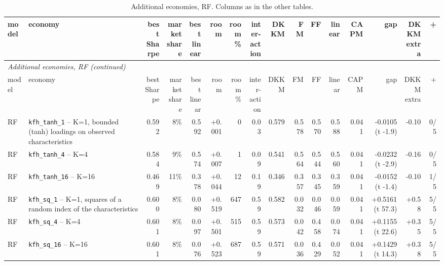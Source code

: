 \begin{landscape}
\begin{longtable}{lp{4.6cm}rrrrrrrrrrrrrr}
\caption{Additional economies, RF. Columns as in the other tables.}\label{tab:xa-rf}\\\hline
model & economy & \shortstack[r]{best\\Sharpe} & \shortstack[r]{market\\share} & \shortstack[r]{best\\linear} & room & \shortstack[r]{room\\\%} & \shortstack[r]{inter-\\action} & DKKM & FM & FF & linear & CAPM & gap & \shortstack[r]{DKKM\\extra} & + \\\hline\endfirsthead
\multicolumn{16}{l}{\textit{Additional economies, RF (continued)}}\\\hline
model & economy & \shortstack[r]{best\\Sharpe} & \shortstack[r]{market\\share} & \shortstack[r]{best\\linear} & room & \shortstack[r]{room\\\%} & \shortstack[r]{inter-\\action} & DKKM & FM & FF & linear & CAPM & gap & \shortstack[r]{DKKM\\extra} & + \\\hline\endhead
\hline\endfoot
RF & \texttt{kfh\_tanh\_1} -- K=1, bounded (tanh) loadings on observed characteristics & 0.592 & 8\% & 0.592 & +0.001 & 0 & 0.03 & 0.579 & 0.578 & 0.570 & 0.588 & 0.041 & -0.0105 (t -1.9) & -0.10 & 0/5 \\
RF & \texttt{kfh\_tanh\_4} -- K=4 & 0.584 & 9\% & 0.574 & +0.007 & 1 & 0.09 & 0.541 & 0.564 & 0.544 & 0.560 & 0.041 & -0.0232 (t -2.9) & -0.16 & 0/5 \\
RF & \texttt{kfh\_tanh\_16} -- K=16 & 0.469 & 11\% & 0.378 & +0.044 & 12 & 0.19 & 0.346 & 0.357 & 0.345 & 0.359 & 0.041 & -0.0152 (t -1.4) & -0.10 & 1/5 \\
RF & \texttt{kfh\_sq\_1} -- K=1, squares of a random index of the characteristics & 0.600 & 8\% & 0.080 & +0.519 & 647 & 0.59 & 0.582 & 0.032 & 0.046 & 0.059 & 0.041 & +0.5161 (t 57.3) & +0.58 & 5/5 \\
RF & \texttt{kfh\_sq\_4} -- K=4 & 0.601 & 8\% & 0.097 & +0.501 & 515 & 0.59 & 0.573 & 0.042 & 0.458 & 0.074 & 0.041 & +0.1155 (t 22.6) & +0.35 & 5/5 \\
RF & \texttt{kfh\_sq\_16} -- K=16 & 0.601 & 8\% & 0.076 & +0.523 & 687 & 0.59 & 0.571 & 0.036 & 0.429 & 0.052 & 0.041 & +0.1429 (t 14.3) & +0.38 & 5/5 \\

\end{longtable}
\end{landscape}
